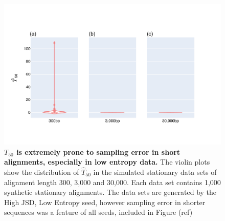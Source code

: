 \begin{figure}[htbp]
\centering
\includegraphics[width=\textwidth]{figures/plots/synthetic/T50/HighJSDLowEntropy-seq_len.pdf}\caption{\textbf{$T_{50}$ is extremely prone to sampling error in short alignments, especially in low entropy data.} The violin plots show the distribution of $\hat T_{50}$ in the simulated stationary data sets of alignment length 300, 3,000 and 30,000. Each data set contains 1,000 synthetic stationary alignments. The data sets are generated by the High JSD, Low Entropy seed, however sampling error in shorter sequences was a feature of all seeds, included in Figure (ref) }
\label{fig:T50-short_long}
\end{figure}